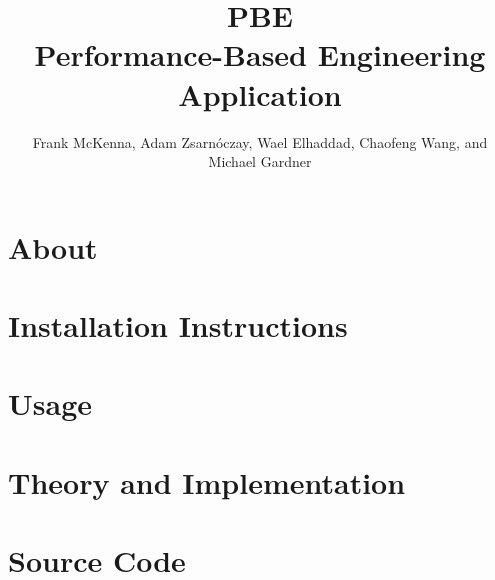\documentclass{simcenterdocumentation}
\begin{document}
\title{PBE\\ Performance-Based Engineering Application}
\author{Frank McKenna, Adam Zsarn\'oczay, Wael Elhaddad, Chaofeng Wang, and Michael Gardner}

\hypersetup{pageanchor=false}
\maketitle
\copyrightpage
\acknowledgments

\hypersetup{pageanchor=true}
\begin{frontmatter}

\pagestyle{plain}
{
  \renewcommand{\thispagestyle}[1]{}
  \tableofcontents
  \clearpage
  \listoffigures
  \clearpage
  \listoftables
}

\end{frontmatter}
\pagestyle{somewhatsimple}


\chapter{About}
\label{chap:about}


\chapter{Installation Instructions}
\label{chap:installation}


\chapter{Usage}
\label{chap:usage}


\chapter{Theory and Implementation}
\label{chap:theory}


\chapter{Source Code}
\label{chap:SourceCode}

\end{document}
